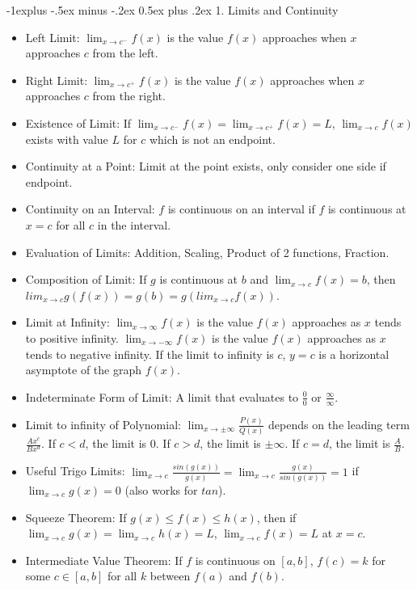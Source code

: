 \documentclass[10pt, portrait]{article}
\makeatletter
\renewcommand{\section}{\@startsection{section}{1}{0mm}%
                                {-1ex plus -.5ex minus -.2ex}%
                                {0.5ex plus .2ex}%
                                {\normalfont\large\bfseries}}
\renewcommand{\section}{\@startsection{section}{2}{0mm}%
                                {-1explus -.5ex minus -.2ex}%
                                {0.5ex plus .2ex}%
                                {\normalfont\normalsize\bfseries}}
\makeatother
\begin{document}
\begin{multicols*}{2}
\section{1. Limits and Continuity}
\begin{itemize}
    \item Left Limit: $\lim_{x \to c^-} f(x)$ is the value $f(x)$ approaches when $x$ approaches $c$ from the left.
    \item Right Limit: $\lim_{x \to c^+} f(x)$ is the value $f(x)$ approaches when $x$ approaches $c$ from the right.
    \item Existence of Limit: If $\lim_{x \to c^-} f(x) = \lim_{x \to c^+} f(x) = L$, $\lim_{x \to c}f(x)$ exists with value $L$ for $c$ which is not an endpoint.
    \item Continuity at a Point: Limit at the point exists, only consider one side if endpoint.
    \item Continuity on an Interval: $f$ is continuous on an interval if $f$ is continuous at $x=c$ for all $c$ in the interval.
    \item Evaluation of Limits: Addition, Scaling, Product of 2 functions, Fraction.
    \item Composition of Limit: If $g$ is continuous at $b$ and $\lim_{x\to c}f(x)=b$, then $lim_{x\to c}g(f(x))=g(b)=g(lim_{x \to c}f(x))$.
    \item Limit at Infinity: $\lim_{x\to \infty}f(x)$ is the value $f(x)$ approaches as $x$ tends to positive infinity. $\lim_{x\to-\infty}f(x)$ is the value $f(x)$ approaches as $x$ tends to negative infinity. If the limit to infinity is $c$, $y=c$ is a horizontal asymptote of the graph $f(x)$.
    \item Indeterminate Form of Limit: A limit that evaluates to $\frac{0}{0}$ or $\frac{\infty}{\infty}$.
    \item Limit to infinity of Polynomial: $\lim_{x\to \pm \infty}\frac{P(x)}{Q(x)}$ depends on the leading term $\frac{Ax^c}{Bx^d}$. If $c < d$, the limit is $0$. If $c > d$, the limit is $\pm\infty$. If $c=d$, the limit is $\frac{A}{B}$.
    \item Useful Trigo Limits: $\lim_{x\to c}\frac{sin(g(x))}{g(x)}=\lim_{x\to c}\frac{g(x)}{sin(g(x))}=1$ if $\lim_{x\to c}g(x)=0$ (also works for $tan$).
    \item Squeeze Theorem: If $g(x) \leq f(x) \leq h(x)$, then if $\lim_{x\to c}g(x)=\lim_{x\to c}h(x)=L$, $\lim_{x\to c}f(x)=L$ at $x=c$.
    \item Intermediate Value Theorem: If $f$ is continuous on $[a, b]$, $f(c)=k$ for some $c \in [a,b]$ for all $k$ between $f(a)$ and $f(b)$.
\end{itemize}


\end{multicols*}
\end{document}

